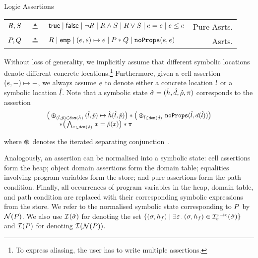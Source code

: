 \vspace{2pt}
\begin{display}{\jsil Logic Assertions}
%
{\small
\begin{tabular}{r@{\ }c@{\ }lr}
  $R, S$ & $\triangleq$ & ${\sf true} \mid {\sf false} \mid  \neg R \mid R \land S \mid R \lor S \mid e = e \mid e \leq e$ & Pure Asrts. \\
  $P, Q$ & $\triangleq$ & $R \mid \texttt{emp} \mid (e, e)\mapsto e \mid P \mathbin{*} Q \mid \texttt{noProps}(e, e)$ & Asrts.
\end{tabular}}
\end{display}

\noindent Without loss of generality, we implicitly assume that different symbolic locations 
denote different concrete locations.\footnote{To express aliasing, the user has to write multiple assertions.}
 Furthermore, given a cell assertion $(e,-) \mapsto -$, we always assume 
 $e$ to denote either a concrete location $l$ or a symbolic location $\hat{l}$. 
%
Note that 
a symbolic state $\hat{\sigma} = (\hat{h}, \hat{d}, \hat\rho, \pi)$ corresponds to the assertion 
\begin{equation*}
{\small \begin{array}{l}
\big(\varoast_{(\sloc, \sexprp) \in \domain(\sheap)} (\sloc, \sexprp) \mapsto \sheap(\sloc, \sexprp)\big) 
  \sep \big(\varoast_{\sloc \in \domain(\sdom)} \, \emptyfields{\sloc}{\idom(\sloc)}\big)  \\
 \qquad \sep \big(\bigwedge_{\jvar \in \domain(\sstore)} \, \jvar = \sstore(\jvar)\big) \sep \pc
\end{array}}
\end{equation*}

\noindent where $\varoast$ denotes the iterated separating conjunction~\cite{citeme}. 


Analogously, an assertion can be normalised into a symbolic state: 
 cell assertions form the heap; 
object domain assertions form the domain table;
 equalities involving program variables form the store; and 
 pure assertions form the path condition. 
Finally,  all occurrences of program variables in the heap, domain table, and path condition 
are replaced with their corresponding symbolic expressions from the store. 
We refer to the normalised symbolic state corresponding 
to $P$ by $\mathcal{N}(P)$. 
%
We also use $\mathcal{I}^{}_{}(\hat{\sigma})$ for denoting the set 
$\{ (\jstate, \heap_f) \mid \exists \senv \, . \, (\jstate, \heap_f) \in \interpret{\symbconc}{\senv}(\sstate) \}$ 
and $\mathcal{I}^{}_{}(P)$ for denoting $\mathcal{I}^{}_{}(\mathcal{N}(P))$. 

